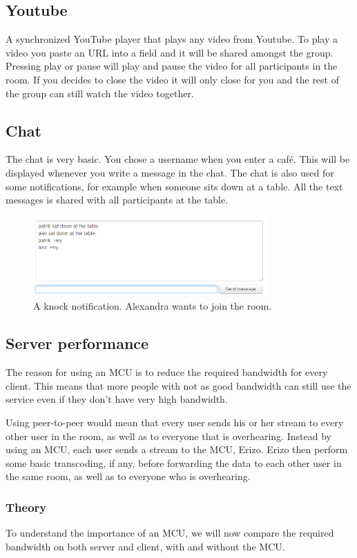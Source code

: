 \documentclass[12pt, titlepage]{article}
\begin{document}
\subsection{Youtube}
A synchronized YouTube player that plays any video from Youtube. To play a video you paste an URL into a field and it will be shared amongst the group. Pressing play or pause will play and pause the video for all participants in the room. If you decides to close the video it will only close for you and the rest of the group can still watch the video together.
\subsection{Chat}
The chat is very basic. You chose a username when you enter a café. This will be displayed whenever you write a message in the chat. The chat is also used for some notifications, for example when someone sits down at a table. All the text messages is shared with all participants at the table.
\begin{figure}[H]
  \centering
	\includegraphics[width=0.8\textwidth,keepaspectratio]{chat.png}
  \caption{A knock notification. Alexandra wants to join the room.}
\end{figure}
\subsection{Server performance}
The reason for using an MCU is to reduce the required bandwidth for every client. This means that more people with not as good bandwidth can still use the service even if they don’t have very high bandwidth. 

Using peer-to-peer would mean that every user sends his or her stream to every other user in the room, as well as to everyone that is overhearing. Instead by using an MCU, each user sends a stream to the MCU, Erizo. Erizo then perform some basic transcoding, if any, before forwarding the data to each other user in the same room, as well as to everyone who is overhearing.

\subsubsection{Theory}
To understand the importance of an MCU, we will now compare the required bandwidth on both server and client, with and without the MCU.
\end{document}
